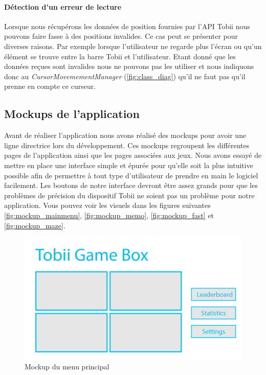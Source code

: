\documentclass{polytech/polytech}
\begin{document}
\paragraph{Détection d'un erreur de lecture}
Lorsque nous récupérons les données de position fournies par l'API Tobii nous pouvons faire fasse à des positions invalides. Ce cas peut se présenter pour diverses raisons. Par exemple lorsque l'utilisateur ne regarde plus l'écran ou qu'un élément se trouve entre la barre Tobii et l'utilisateur. Etant donné que les données reçues sont invalides nous ne pouvons pas les utiliser et nous indiquons donc au \textit{CursorMovemementManager} (\autoref{fig:class_diag}) qu'il ne faut pas qu'il prenne en compte ce curseur.

\subsection{Mockups de l'application}
\label{sec:mockups}
Avant de réaliser l'application nous avons réalisé des mockups pour avoir une ligne directrice lors du développement. Ces mockups regroupent les différentes pages de l'application ainsi que les pages associées aux jeux. 
Nous avons essayé de mettre en place une interface simple et épurée pour qu'elle soit la plus intuitive possible afin de permettre à tout type d'utilisateur de prendre en main le logiciel facilement. Les boutons de notre interface devront être assez grands pour que les problèmes de précision du dispositif Tobii ne soient pas un problème pour notre application. Vous pouvez voir les visuels dans les figures suivantes \autoref{fig:mockup_mainmenu}, \autoref{fig:mockup_memo}, \autoref{fig:mockup_fast} et \autoref{fig:mockup_maze}.

\begin{figure}
    \centering
    \includegraphics[width=15cm]{img/mockups/MainMenu.png}
    \caption{Mockup du menu principal}
    \label{fig:mockup_mainmenu}
\end{figure}
\end{document}
